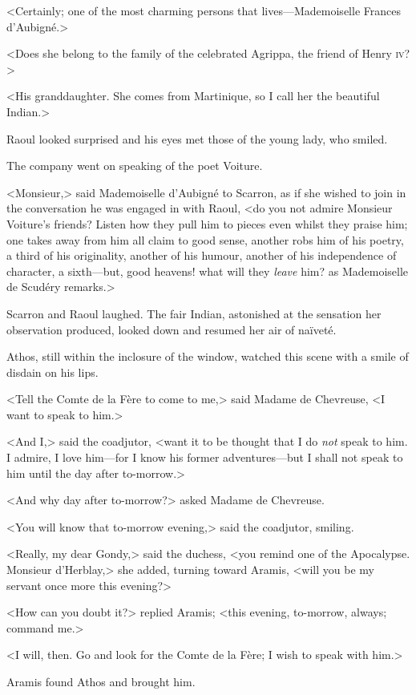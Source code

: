 <Certainly; one of the most charming persons that lives—Mademoiselle Frances d'Aubigné.>

<Does she belong to the family of the celebrated Agrippa, the friend of Henry \textsc{iv}?>

<His granddaughter. She comes from Martinique, so I call her the beautiful Indian.>

Raoul looked surprised and his eyes met those of the young lady, who smiled.

The company went on speaking of the poet Voiture.

<Monsieur,> said Mademoiselle d'Aubigné to Scarron, as if she wished to join in the conversation he was engaged in with Raoul, <do you not admire Monsieur Voiture's friends? Listen how they pull him to pieces even whilst they praise him; one takes away from him all claim to good sense, another robs him of his poetry, a third of his originality, another of his humour, another of his independence of character, a sixth—but, good heavens! what will they \textit{leave} him? as Mademoiselle de Scudéry remarks.>

Scarron and Raoul laughed. The fair Indian, astonished at the sensation her observation produced, looked down and resumed her air of naïveté.

Athos, still within the inclosure of the window, watched this scene with a smile of disdain on his lips.

<Tell the Comte de la Fère to come to me,> said Madame de Chevreuse, <I want to speak to him.>

<And I,> said the coadjutor, <want it to be thought that I do \textit{not} speak to him. I admire, I love him—for I know his former adventures—but I shall not speak to him until the day after to-morrow.>

<And why day after to-morrow?> asked Madame de Chevreuse.

<You will know that to-morrow evening,> said the coadjutor, smiling.

<Really, my dear Gondy,> said the duchess, <you remind one of the Apocalypse. Monsieur d'Herblay,> she added, turning toward Aramis, <will you be my servant once more this evening?>

<How can you doubt it?> replied Aramis; <this evening, to-morrow, always; command me.>

<I will, then. Go and look for the Comte de la Fère; I wish to speak with him.>

Aramis found Athos and brought him.


